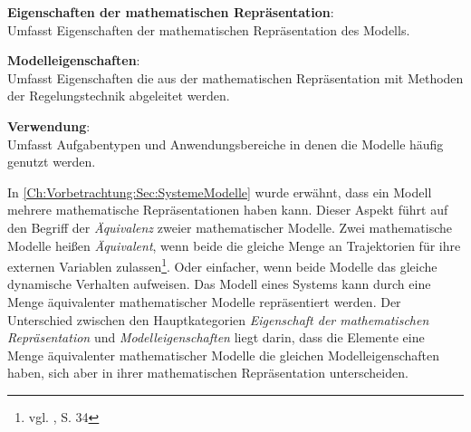 \textbf{Eigenschaften der mathematischen Repräsentation}: \\
Umfasst Eigenschaften der mathematischen Repräsentation des Modells.   %

\textbf{Modelleigenschaften}: \\ %
Umfasst Eigenschaften die aus der mathematischen Repräsentation mit Methoden der Regelungstechnik abgeleitet werden.

\textbf{Verwendung}: \\
Umfasst Aufgabentypen und Anwendungsbereiche in denen die Modelle häufig genutzt werden.

In \autoref{Ch:Vorbetrachtung:Sec:SystemeModelle} wurde erwähnt, dass ein Modell mehrere mathematische Repräsentationen haben kann. Dieser Aspekt führt auf den Begriff der \textit{Äquivalenz} zweier mathematischer Modelle. Zwei mathematische Modelle heißen \textit{Äquivalent}, wenn beide die gleiche Menge an Trajektorien für ihre externen Variablen zulassen\footnote{vgl. \cite{SCH89}, S. 34}. Oder einfacher, wenn beide Modelle das gleiche dynamische Verhalten aufweisen. Das Modell eines Systems kann durch eine Menge äquivalenter mathematischer Modelle repräsentiert werden. Der Unterschied zwischen den Hauptkategorien \textit{Eigenschaft der mathematischen Repräsentation} und \textit{Modelleigenschaften} liegt darin, dass die Elemente eine Menge äquivalenter mathematischer Modelle die gleichen Modelleigenschaften haben, sich aber in ihrer mathematischen Repräsentation unterscheiden.

